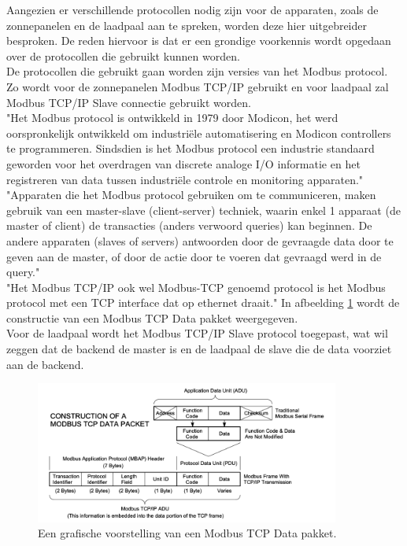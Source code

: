 Aangezien er verschillende protocollen nodig zijn voor de apparaten, zoals de zonnepanelen en de laadpaal aan te spreken, worden deze hier uitgebreider besproken. De reden hiervoor is dat er een grondige voorkennis wordt opgedaan over de protocollen die gebruikt kunnen worden.\\

De protocollen die gebruikt gaan worden zijn versies van het Modbus protocol. Zo wordt voor de zonnepanelen Modbus TCP/IP gebruikt en voor laadpaal zal Modbus TCP/IP Slave connectie gebruikt worden.\\

"Het Modbus protocol is ontwikkeld in 1979 door Modicon, het werd oorspronkelijk ontwikkeld om industriële automatisering en Modicon controllers te programmeren. Sindsdien is het Modbus protocol een industrie standaard geworden voor het overdragen van discrete analoge I/O informatie en het registreren van data tussen industriële controle en monitoring apparaten." \autocite{Acromag2005} \\

"Apparaten die het Modbus protocol gebruiken om te communiceren, maken gebruik van een master-slave (client-server) techniek, waarin enkel 1 apparaat (de master of client) de transacties (anders verwoord queries) kan beginnen. De andere apparaten (slaves of servers) antwoorden door de gevraagde data door te geven aan de master, of door de actie door te voeren dat gevraagd werd in de query." \autocite{Acromag2005} \\

"Het Modbus TCP/IP ook wel Modbus-TCP genoemd protocol is het Modbus protocol met een TCP interface dat op ethernet draait." \autocite{Acromag2005} In afbeelding \ref{fig:modbus-data-pakket} wordt de constructie van een Modbus TCP Data pakket weergegeven.\\

Voor de laadpaal wordt het Modbus TCP/IP Slave protocol toegepast, wat wil zeggen dat de backend de master is en de laadpaal de slave die de data voorziet aan de backend.

\begin{figure}[h]
    \includegraphics[width=10cm]{./graphics/Modbus-TCP-schema.png}
    \caption{Een grafische voorstelling van een Modbus TCP Data pakket. \autocite{Acromag2005}}
    \label{fig:modbus-data-pakket}
\end{figure}

